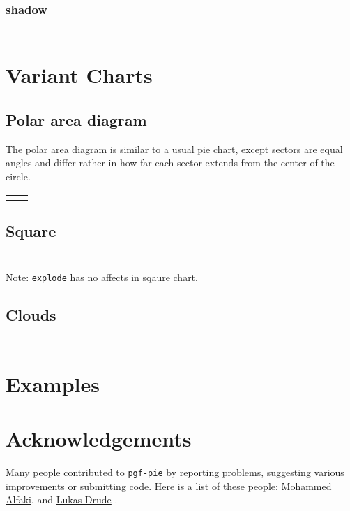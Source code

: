 \documentclass{article}
\newcommand{\demo}[2][1]{
  \begin{center}
  \begin{tabular}{cc}
    \begin{minipage}{.49\linewidth}
      \centering
      \resizebox{#1\linewidth}{!}{
        
      }
    \end{minipage}
    &
    \begin{minipage}{.45\linewidth}
      
    \end{minipage}
  \end{tabular}
  \end{center}
}
\newcommand{\example}[2][1]{
  \begin{center}
    \resizebox{#1\linewidth}{!}{
      
    }
  \end{center}
  
}
\begin{document}
\subsubsection{shadow}
\demo[0.6]{shadow}

\section{Variant Charts}
\subsection{Polar area diagram}
The polar area diagram is similar to a usual pie chart, except sectors
are equal angles and differ rather in how far each sector extends from
the center of the circle.

\demo[0.6]{polar}

\subsection{Square}

\demo[0.6]{square}

Note: \texttt{explode} has no affects in sqaure chart.

\subsection{Clouds}

\demo[0.6]{cloud}

\section{Examples}


\section{Acknowledgements}
Many people contributed to \texttt{pgf-pie} by reporting problems,
suggesting various improvements or submitting code. Here is a list of
these people:
\href{mailto:mohammed.alfaki@ii.uib.no}{Mohammed Alfaki},
and
\href{mailto:ldrude@mail.uni-paderborn.de}{Lukas Drude}
.
\end{document}
